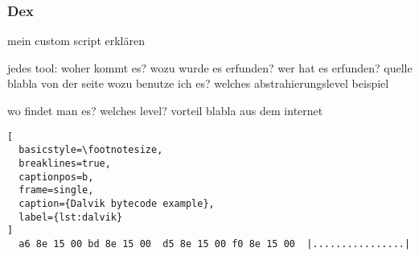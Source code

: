 \subsubsection{Dex}\label{subsubsection:tools-dex}
mein custom script erklären

jedes tool:\newline
woher kommt es?\newline
wozu wurde es erfunden?\newline
wer hat es erfunden? quelle\newline
blabla von der seite\newline
wozu benutze ich es?\newline
welches abstrahierungslevel\newline
beispiel\newline


wo findet man es?\newline
welches level?\newline
vorteil\newline
blabla aus dem internet\newline



\begin{lstlisting}[
  basicstyle=\footnotesize,
  breaklines=true,
  captionpos=b,
  frame=single,
  caption={Dalvik bytecode example},
  label={lst:dalvik}
]
  a6 8e 15 00 bd 8e 15 00  d5 8e 15 00 f0 8e 15 00  |................|
\end{lstlisting}
